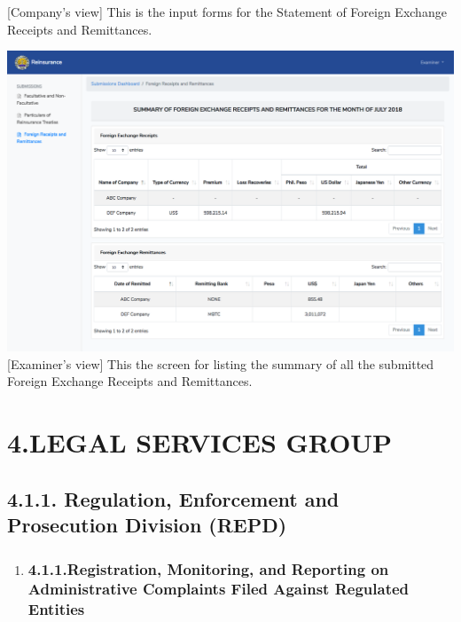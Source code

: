 \documentclass{article}
\begin{document}
[Company’s view] This is the input forms for the
Statement of Foreign Exchange Receipts and Remittances.%

\includegraphics[keepaspectratio=true]{up-ic-screens/image93}{}[Examiner’s view] This the screen for listing the summary
of all the submitted Foreign Exchange Receipts and Remittances.%

\section{4.\hspace*{0.5em}LEGAL SERVICES GROUP}\label{sec-legal-services-group}%

\subsection{4.1.\hspace*{0.5em}1.  Regulation, Enforcement and Prosecution Division (REPD)}\label{sec-1-regulation-enforcement-and-prosecution-division-repd}%

\begin{enumerate}[noitemsep,topsep=\mdcompacttopsep]%

\item{}
\subsubsection{4.1.1.\hspace*{0.5em}Registration, Monitoring, and Reporting on Administrative Complaints Filed Against Regulated Entities}\label{sec-registration-monitoring-and-reporting-on-administrative-complaints-filed-against-regulated-entities}%
\end{enumerate}%
\end{document}
